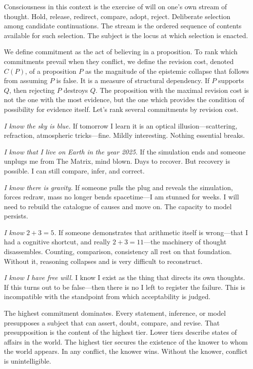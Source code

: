 Consciousness in this context is the exercise of will on one's own stream of thought. Hold, release, redirect, compare, adopt, reject. Deliberate selection among candidate continuations. The stream is the ordered sequence of contents available for such selection. The subject is the locus at which selection is enacted.

We define commitment as the act of believing in a proposition. To rank which commitments prevail when they conflict, we define the revision cost, denoted $C(P)$, of a proposition $P$ as the magnitude of the epistemic collapse that follows from assuming $P$ is false. It is a measure of structural dependency. If $P$ supports $Q$, then rejecting $P$ destroys $Q$. The proposition with the maximal revision cost is not the one with the most evidence, but the one which provides the condition of possibility for evidence itself. Let's rank several commitments by revision cost.

\textit{I know the sky is blue.} If tomorrow I learn it is an optical illusion—scattering, refraction, atmospheric tricks—fine. Mildly interesting. Nothing essential breaks.

\textit{I know that I live on Earth in the year 2025.} If the simulation ends and someone unplugs me from \QENOpen{}The Matrix\QENClose{}, mind blown. Days to recover. But recovery is possible. I can still compare, infer, and correct.

\textit{I know there is gravity.} If someone pulls the plug and reveals the simulation, forces redraw, mass no longer bends spacetime—I am stunned for weeks. I will need to rebuild the catalogue of causes and move on. The capacity to model persists.

\textit{I know $2+3=5$.} If someone demonstrates that arithmetic itself is wrong—that I had a cognitive shortcut, and really $2+3=11$—the machinery of thought disassembles. Counting, comparison, consistency all rest on that foundation. Without it, reasoning collapses and is very difficult to reconstruct.

\textit{I know I have free will.} I know I exist as the thing that directs its own thoughts. If this turns out to be false—then there is no \QSOpen{}I\QSClose{} left to register the failure. This is incompatible with the standpoint from which acceptability is judged.

The highest commitment dominates. Every statement, inference, or model presupposes a subject that can assert, doubt, compare, and revise. That presupposition is the content of the highest tier. Lower tiers describe states of affairs in the world. The highest tier secures the existence of the knower to whom the world appears. In any conflict, the knower wins. Without the knower, conflict is unintelligible.

